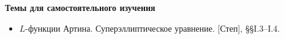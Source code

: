 \documentclass[a4paper, 11pt]{article}
\begin{document}

\noindent\textbf{Темы для самостоятельного изучения}
\begin{itemize}[topsep=0pt]
    \item $L$-функции Артина. Суперэллиптическое уравнение. [Степ], \S\S I.3--I.4.
\end{itemize}
\end{document}
